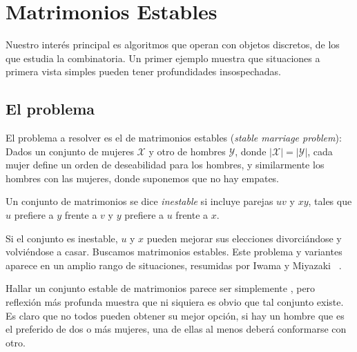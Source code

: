 

\chapter{Matrimonios Estables}
\label{cha:gale-shapley}

  Nuestro interés principal es algoritmos que operan con objetos discretos,
  de los que estudia la combinatoria.
  Un primer ejemplo muestra que situaciones a primera vista simples
  pueden tener profundidades insospechadas.

\section{El problema}
\label{sec:stable-marriage-problem}

  El problema a resolver es el de matrimonios estables
  (\emph{\foreignlanguage{english}{stable marriage problem}}):
  Dados un conjunto de mujeres \(\mathscr{X}\)
  y otro de hombres \(\mathscr{Y}\),
  donde \(\lvert \mathscr{X} \rvert = \lvert \mathscr{Y} \rvert\),
  cada mujer define un orden de deseabilidad para los hombres,
  y similarmente los hombres con las mujeres,
  donde suponemos que no hay empates.
  \begin{definition}
    Un conjunto de matrimonios se dice \emph{inestable}
    si incluye parejas \(u v\) y \(x y\),
    tales que \(u\) prefiere a \(y\) frente a \(v\)
    y \(y\) prefiere a \(u\) frente a \(x\).
  \end{definition}
  Si el conjunto es inestable,
  \(u\) y \(x\) pueden mejorar sus elecciones divorciándose
  y volviéndose a casar.
  Buscamos matrimonios estables.
  Este problema y variantes aparece en un amplio rango de situaciones,
  resumidas por Iwama y Miyazaki~%
    \cite{iwama08:_stable_marriage_probl_survey}.

  Hallar un conjunto estable de matrimonios parece ser simplemente
  ,
  pero reflexión más profunda muestra que ni siquiera es obvio
  que tal conjunto existe.
  Es claro que no todos pueden obtener su mejor opción,
  si hay un hombre que es el preferido de dos o más mujeres,
  una de ellas al menos deberá conformarse con otro.

